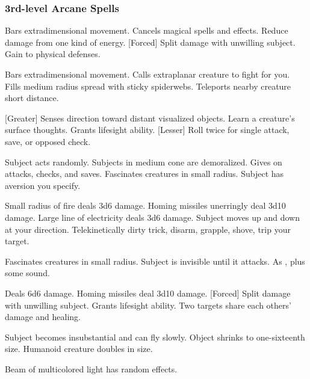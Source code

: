 \subsubsection{3rd-level Arcane Spells} 
\begin{swspelllist}
     Bars extradimensional movement.
     Cancels magical spells and effects.
     Reduce damage from one kind of energy.
    [Forced] Split damage with unwilling subject.
     Gain  to physical defenses.

     Bars extradimensional movement.
     Calls extraplanar creature to fight for you.
     Fills medium radius spread with sticky spiderwebs.
     Teleports nearby creature short distance.

    [Greater] Senses direction toward distant visualized objects.
     Learn a creature's surface thoughts.
     Grants lifesight ability.
    [Lesser] Roll twice for single attack, save, or opposed check.

     Subject acts randomly.
     Subjects in medium cone are demoralized.
     Gives  on attacks, checks, and saves.
     Fascinates creatures in small radius.
     Subject has aversion you specify.

     Small radius of fire deals 3d6 damage.
     Homing missiles unerringly deal 3d10 damage.
     Large line of electricity deals 3d6 damage.
     Subject moves up and down at your direction.
     Telekinetically dirty trick, disarm, grapple, shove, trip your target.

     Fascinates creatures in small radius.
     Subject is invisible until it attacks.
     As , plus some sound.

     Deals 6d6 damage.
     Homing missiles deal 3d10 damage.
    [Forced] Split damage with unwilling subject.
     Grants lifesight ability.
     Two targets share each others' damage and healing.

     Subject becomes insubstantial and can fly slowly.
     Object shrinks to one-sixteenth size.
     Humanoid creature doubles in size.

     Beam of multicolored light has random effects.
\end{swspelllist}

